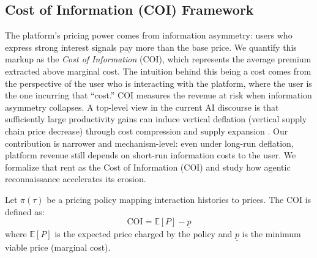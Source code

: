 \subsection{Cost of Information (COI) Framework}

The platform's pricing power comes from information asymmetry: users who express strong interest signals pay more than the base price. We quantify this markup as the \textit{Cost of Information} (COI), which represents the average premium extracted above marginal cost. The intuition behind this being a cost comes from the perspective of the user who is interacting with the platform, where the user is the one incurring that ``cost.'' COI measures the revenue at risk when information asymmetry collapses.
A top-level view in the current AI discourse is that sufficiently large productivity gains can induce vertical deflation (vertical supply chain price decrease) through cost compression and supply expansion \parencite{rachitsky_marc_2026}. Our contribution is narrower and mechanism-level: even under long-run deflation, platform revenue still depends on short-run information costs to the user. We formalize that rent as the Cost of Information (COI) and study how agentic reconnaissance accelerates its erosion.

\begin{definition}
Let $\pi(\tau)$ be a pricing policy mapping interaction histories to prices. The COI is defined as:
\begin{equation}
\text{COI} = \mathbb{E}[P] - \underline{p}
\end{equation}
where $\mathbb{E}[P]$ is the expected price charged by the policy and $\underline{p}$ is the minimum viable price (marginal cost).
\end{definition}

